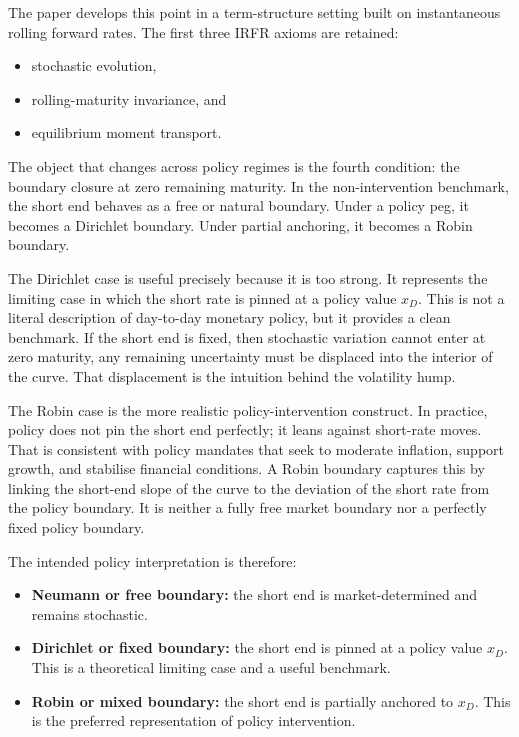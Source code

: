 \documentclass[11pt]{article}
\numberwithin{equation}{section}
\begin{document}
The paper develops this point in a term-structure setting built on instantaneous rolling forward rates. The first three IRFR axioms are retained: 
\begin{itemize}
\item stochastic evolution, 
\item rolling-maturity invariance, and 
\item equilibrium moment transport.  
\end{itemize}
The object that changes across policy regimes is the fourth condition: the boundary closure at zero remaining maturity.
In the non-intervention benchmark, the short end behaves as a free or natural boundary. Under a policy peg, it becomes a Dirichlet boundary. Under partial anchoring, it becomes a Robin boundary.

The Dirichlet case is useful precisely because it is too strong. It represents the limiting case in which the short rate is pinned at a policy value $x_D$. This is not a literal description of day-to-day monetary policy, but it provides a clean benchmark. If the short end is fixed, then stochastic variation cannot enter at zero maturity, any remaining uncertainty must be displaced into the interior of the curve. That displacement is the intuition behind the volatility hump.

The Robin case is the more realistic policy-intervention construct. In practice, policy does not pin the short end perfectly; it leans against short-rate moves. That is consistent with policy mandates that seek to moderate inflation, support growth, and stabilise financial conditions. A Robin boundary captures this by linking the short-end slope of the curve to the deviation of the short rate from the policy boundary. It is neither a fully free market boundary nor a perfectly fixed policy boundary.

The intended policy interpretation is therefore:
\begin{itemize}
  \item \textbf{Neumann or free boundary:} the short end is market-determined and remains stochastic.
  \item \textbf{Dirichlet or fixed boundary:} the short end is pinned at a policy value $x_D$. This is a theoretical limiting case and a useful benchmark.
  \item \textbf{Robin or mixed boundary:} the short end is partially anchored to $x_D$. This is the preferred representation of policy intervention.
\end{itemize}
\end{document}
